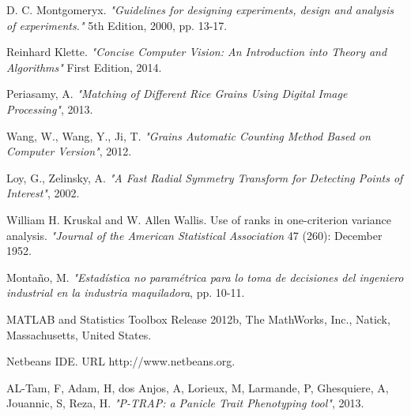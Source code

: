 \begin{thebibliography}{9}
D. C. Montgomeryx.
\textit{"Guidelines for designing experiments, design and analysis of experiments."} 5th Edition, 2000, pp. 13-17.

Reinhard Klette.
\textit{"Concise Computer Vision: An Introduction into Theory and Algorithms"} First Edition, 2014.

Periasamy, A. 
\textit{"Matching of Different Rice Grains Using Digital Image Processing"}, 2013.

Wang, W., Wang, Y., Ji, T. 
\textit{"Grains Automatic Counting Method Based on Computer Version"}, 2012.

Loy, G., Zelinsky, A. 
\textit{"A Fast Radial Symmetry Transform for Detecting Points of Interest"}, 2002.

William H. Kruskal and W. Allen Wallis. 
Use of ranks in one-criterion variance analysis. \textit{"Journal of the American Statistical Association} 47 (260): December 1952.

Monta\~no, M. 
\textit{"Estad\'istica no param\'etrica para lo toma de decisiones del ingeniero industrial en la industria maquiladora}, pp. 10-11.

MATLAB and Statistics Toolbox Release 2012b, The MathWorks, Inc., Natick, Massachusetts, United States.

Netbeans IDE. URL http://www.netbeans.org.

AL-Tam, F, Adam, H, dos Anjos, A, Lorieux, M, Larmande, P, Ghesquiere, A, Jouannic, S, Reza, H. \textit{"P-TRAP: a Panicle Trait Phenotyping tool"}, 2013.
\end{thebibliography}